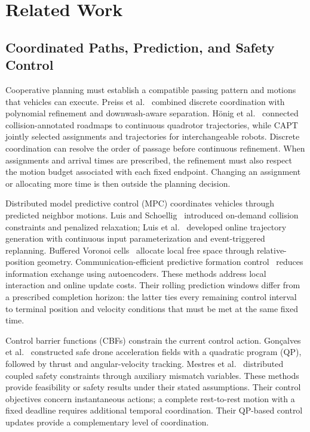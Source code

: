 \section{Related Work}
\label{sec:related}
\subsection{Coordinated Paths, Prediction, and Safety Control}
Cooperative planning must establish a compatible passing pattern and motions that vehicles can execute. Preiss et al.~\cite{preiss2017} combined discrete coordination with polynomial refinement and downwash-aware separation. H\"onig et al.~\cite{hoenig2018} connected collision-annotated roadmaps to continuous quadrotor trajectories, while CAPT~\cite{turpin2014} jointly selected assignments and trajectories for interchangeable robots. Discrete coordination can resolve the order of passage before continuous refinement. When assignments and arrival times are prescribed, the refinement must also respect the motion budget associated with each fixed endpoint. Changing an assignment or allocating more time is then outside the planning decision.

Distributed model predictive control (MPC) coordinates vehicles through predicted neighbor motions. Luis and Schoellig~\cite{luis2019} introduced on-demand collision constraints and penalized relaxation; Luis et al.~\cite{luis2020} developed online trajectory generation with continuous input parameterization and event-triggered replanning. Buffered Voronoi cells~\cite{zhou2017bvc} allocate local free space through relative-position geometry. Communication-efficient predictive formation control~\cite{schiz2025communication} reduces information exchange using autoencoders. These methods address local interaction and online update costs. Their rolling prediction windows differ from a prescribed completion horizon: the latter ties every remaining control interval to terminal position and velocity conditions that must be met at the same fixed time.

Control barrier functions (CBFs) constrain the current control action. Gon\c{c}alves et al.~\cite{goncalves2024} constructed safe drone acceleration fields with a quadratic program (QP), followed by thrust and angular-velocity tracking. Mestres et al.~\cite{mestre2024} distributed coupled safety constraints through auxiliary mismatch variables. These methods provide feasibility or safety results under their stated assumptions. Their control objectives concern instantaneous actions; a complete rest-to-rest motion with a fixed deadline requires additional temporal coordination. Their QP-based control updates provide a complementary level of coordination.

